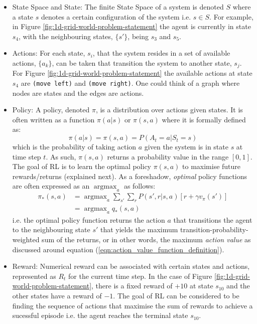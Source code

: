 \documentclass[a4paper,11pt]{article}
\DeclareMathOperator*{\argmax}{argmax}
\begin{document}
\begin{itemize}
    \item State Space and State: The finite State Space of a system is denoted $S$ where a state $s$ denotes a certain configuration of the system i.e. $s \in S$.  For example, in Figure \ref{fig:1d-grid-world-problem-statement} the agent is currently in state $s_4$, with the neighbouring states, $\{s'\}$, being $s_3$ and $s_5$.
    \item Actions: For each state, $s_i$, that the system resides in a set of available actions, $\{a_k\}$, can be taken that transition the system to another state, $s_j$.  For Figure \ref{fig:1d-grid-world-problem-statement} the available actions at state $s_4$ are \verb|(move left)| and \verb|(move right)|.  One could think of a graph where nodes are states and the edges are actions.
    \item Policy: A policy, denoted $\pi$, is a distribution over actions given states.  It is often written as a function $\pi(a|s)$ or $\pi(s, a)$ where it is formally defined as:
    \begin{equation} \label{eqn:policy_formal_definition}
        \pi(a|s) = \pi(s,a) = P(A_t=a|S_t=s)
    \end{equation}
    which is the probability of taking action $a$ given the system is in state $s$ at time step $t$. As such, $\pi(s, a)$ returns a probability value in the range $[0,1]$. The goal of RL is to learn the optimal policy $\pi(s,a)$ to maximise future rewards/returns (explained next). As a foreshadow, {\it optimal} policy functions are often expressed as an $\argmax_a$ as follows:
    \begin{equation} \label{eqn:value_iteration_foreshadow}
    \begin{split}
        \pi_{*}(s,a) &= \argmax_a \sum_{s'} \sum_{r} P(s',r|s,a)[r + \gamma v_{\pi}(s')] \\
        &= \argmax_a q_{*} (s,a)
    \end{split}
    \end{equation}
    i.e. the optimal policy function returns the action $a$ that transitions the agent to the neighbouring state $s'$ that yields the maximum transition-probability-weighted sum of the returns, or in other words, the maximum {\it action value} as discussed around equation (\ref{eqn:action_value_function_definition}).
    \item Reward: Numerical reward can be associated with certain states and actions, represented as $R_t$ for the current time step.  In the case of Figure \ref{fig:1d-grid-world-problem-statement}, there is a fixed reward of $+10$ at state $s_{10}$ and the other states have a reward of $-1$.  The goal of RL can be considered to be finding the sequence of actions that maximise the sum of rewards to achieve a sucessful episode i.e. the agent reaches the terminal state $s_{10}$.

\end{itemize}
\end{document}
